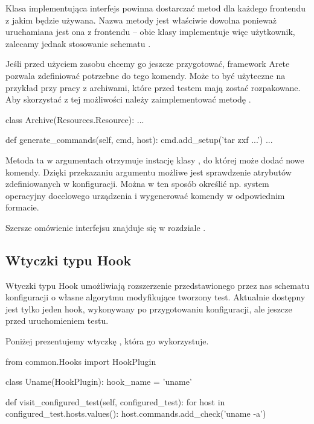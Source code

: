 \documentclass[00-praca-magisterska.tex]{subfiles}
\begin{document}
Klasa implementująca interfejs  powinna dostarczać metod
 dla każdego frontendu z jakim będzie używana. Nazwa
metody jest właściwie dowolna ponieważ uruchamiana jest ona z frontendu -- obie
klasy implementuje więc użytkownik, zalecamy jednak stosowanie schematu
.

Jeśli przed użyciem zasobu chcemy go jeszcze przygotować, framework Arete
pozwala zdefiniować potrzebne do tego komendy. Może to być użyteczne na
przykład przy pracy z archiwami, które przed testem mają zostać rozpakowane. Aby
skorzystać z tej możliwości należy zaimplementować metodę
.

\begin{pythoncode}
  class Archive(Resources.Resource):
      ...

      def generate_commands(self, cmd, host):
          cmd.add_setup('tar zxf ...')
	  ...
\end{pythoncode}

Metoda ta w argumentach otrzymuje instację klasy , do której
może dodać nowe komendy. Dzięki przekazaniu argumentu  możliwe jest
sprawdzenie atrybutów zdefiniowanych w konfiguracji. Można w ten sposób
określić np. system operacyjny docelowego urządzenia i wygenerować komendy w
odpowiednim formacie.

Szersze omówienie interfejsu  znajduje się w rozdziale
.

\subsection{Wtyczki typu Hook}

Wtyczki typu Hook umożliwiają rozszerzenie przedstawionego przez nas schematu
konfiguracji o własne algorytmu modyfikujące tworzony test. Aktualnie dostępny
jest tylko jeden hook, wykonywany po przygotowaniu konfiguracji, ale jeszcze
przed uruchomieniem testu.

Poniżej prezentujemy wtyczkę , która go wykorzystuje.

\begin{pythoncode}
  from common.Hooks import HookPlugin
  
  class Uname(HookPlugin):
      hook_name = 'uname'
  
      def visit_configured_test(self, configured_test):
          for host in configured_test.hosts.values():
              host.commands.add_check('uname -a')
\end{pythoncode}
\end{document}

